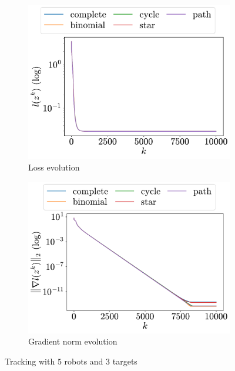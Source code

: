 \documentclass[a4paper,11pt,oneside]{book}
\begin{document}
\begin{figure}[H]
      \centering
      \begin{subfigure}[t]{0.48\linewidth}
            \centering
            \includegraphics[width=\linewidth]{./figs/tracking/5_3_2/loss.pdf} 
            \caption{Loss evolution}
      \end{subfigure}
      \hfill
      \begin{subfigure}[t]{0.48\linewidth}
            \centering
            \includegraphics[width=\linewidth]{./figs/tracking/5_3_2/gradient.pdf} 
            \caption{Gradient norm evolution}
      \end{subfigure}
      \caption{Tracking with $5$ robots and $3$ targets}
      \label{fig:tracking_5_3}
\end{figure}
\end{document}

